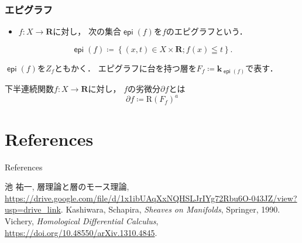 \documentclass[dvipdfmx,12pt,aspectratio=169,leqno]{beamer}%
\newcommand{\rr}{\mathbf{R}}
\newcommand{\kk}{\mathbf{k}}
\newcommand{\p}{\partial}
\numberwithin{equation}{subsection}
\newcommand{\epi}{\mathop{\mathsf{epi}}\nolimits}
\theoremstyle{mystyle}
\begin{document}
\begin{frame}
    \frametitle{エピグラフ}
    
    \begin{definition}
        \begin{itemize}
            \item \(f\colon X\to \rr\)に対し，
            次の集合\(\epi(f)\)を\(f\)のエピグラフという．
        \end{itemize}
        \[
            \epi(f)\coloneqq
            \left\{(x,t)\in X\times \rr;f(x)\leqq t\right\}.
        \]
    \end{definition}
    \(\epi(f)\)を\(Z_f\)ともかく．
    エピグラフに台を持つ層を\(
            F_{f}\coloneqq\kk_{\epi(f)}\)で表す．
    \begin{definition}[ホモロジカル劣微分]
        下半連続関数\(f\colon X\to \rr\)に対し，
        \(f\)の劣微分\(\p f\)とは
        \[\p f\coloneqq \mathrm{R}(F_{f})^{a}\]
    \end{definition}

\end{frame}


\section{References}

\begin{frame}[allowframebreaks]{References}
    \begin{thebibliography}{90}\beamertemplatetextbibitems
         池 祐一, 
        層理論と層のモース理論, \url{https://drive.google.com/file/d/1x1ibUAqXxNQHSLJrIYg72Rbu6O-043JZ/view?usp=drive_link}.
         Kashiwara, Schapira, 
        \textit{Sheaves on Manifolds}, Springer, 1990.
         Vichery, 
        \textit{Homological Differential Calculus}, \url{https://doi.org/10.48550/arXiv.1310.4845}.
    \end{thebibliography}
\end{frame}

\begin{comment}
\begin{frame}[noframenumbering]
aaa
\end{frame}
\end{comment}
\end{document}
